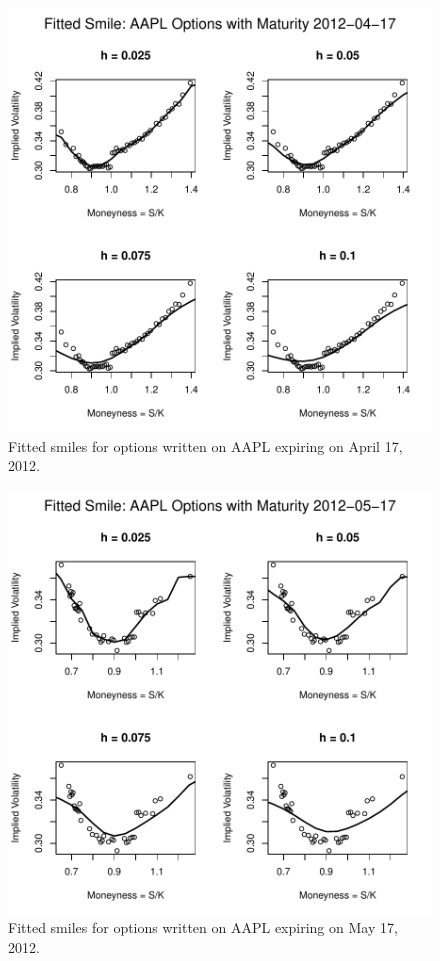 \documentclass[11pt]{article}
\begin{document}
\begin{figure}[H]
	\centering
 	\includegraphics{../plots/q2/expl_fitted_smile_apr.pdf}
\caption{Fitted smiles for options written on AAPL expiring on April 17, 2012.}
\label{fig:expl_fitted_apr}
\end{figure}
\begin{figure}[H]
	\centering
 	\includegraphics{../plots/q2/expl_fitted_smile_may.pdf}
\caption{Fitted smiles for options written on AAPL expiring on May 17, 2012.}
\label{fig:expl_fitted_may}
\end{figure}
\end{document}
